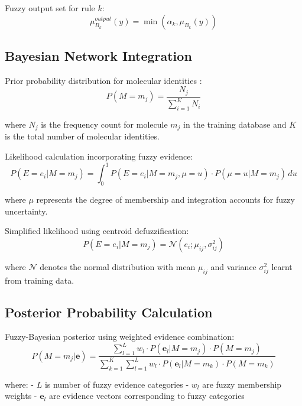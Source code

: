 \documentclass[12pt,a4paper]{article}
\begin{document}
Fuzzy output set for rule $k$:
\begin{equation}
\mu_{B_k}^{output}(y) = \min(\alpha_k, \mu_{B_k}(y))
\end{equation}

\subsection{Bayesian Network Integration}

Prior probability distribution for molecular identities \cite{laplace1814essai}:
\begin{equation}
P(M = m_j) = \frac{N_j}{\sum_{i=1}^K N_i}
\end{equation}

where $N_j$ is the frequency count for molecule $m_j$ in the training database and $K$ is the total number of molecular identities.

Likelihood calculation incorporating fuzzy evidence:
\begin{equation}
P(E = e_i | M = m_j) = \int_0^1 P(E = e_i | M = m_j, \mu = u) \cdot P(\mu = u | M = m_j) \, du
\end{equation}

where $\mu$ represents the degree of membership and integration accounts for fuzzy uncertainty.

Simplified likelihood using centroid defuzzification:
\begin{equation}
P(E = e_i | M = m_j) = \mathcal{N}(e_i; \mu_{ij}, \sigma_{ij}^2)
\end{equation}

where $\mathcal{N}$ denotes the normal distribution with mean $\mu_{ij}$ and variance $\sigma_{ij}^2$ learnt from training data.

\subsection{Posterior Probability Calculation}

Fuzzy-Bayesian posterior using weighted evidence combination:
\begin{equation}
P(M = m_j | \mathbf{e}) = \frac{\sum_{l=1}^L w_l \cdot P(\mathbf{e}_l | M = m_j) \cdot P(M = m_j)}{\sum_{k=1}^K \sum_{l=1}^L w_l \cdot P(\mathbf{e}_l | M = m_k) \cdot P(M = m_k)}
\end{equation}

where:
- $L$ is number of fuzzy evidence categories
- $w_l$ are fuzzy membership weights
- $\mathbf{e}_l$ are evidence vectors corresponding to fuzzy categories
\end{document}
